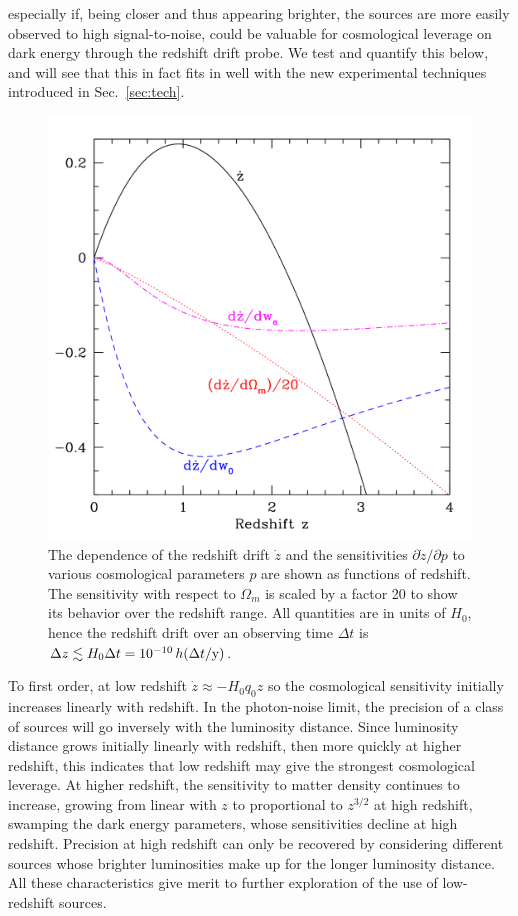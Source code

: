 \documentclass[preprint2, 10pt]{aastex}
\begin{document}
{especially if, being closer and thus appearing brighter, the sources are more
easily observed to high signal-to-noise,
could be valuable for cosmological leverage on dark energy 
through the redshift drift probe. We test and quantify this below, and will see that this in fact fits in 
well with the new experimental techniques introduced in Sec.~\ref{sec:tech}. 


\begin{figure}[tbp] 
   \centering
   \includegraphics[width=\columnwidth]{zdriftd.pdf}
\caption{The dependence of the redshift drift $\dot z$ and the sensitivities 
$\partial\dot z/\partial p$ to various cosmological parameters $p$ are shown 
as functions of redshift. The sensitivity with respect to $\Omega_m$ is 
scaled by a factor 20 to show its behavior over the redshift range. All quantities are in units of $H_0$, hence 
the redshift drift over an observing time $\Delta t$ is 
$\Delta z\lesssim H_0\Delta t=10^{-10}\,h(\Delta t/{\rm y})$. 
}
\label{fig:sens} 
\end{figure}

To first order, at
low redshift $\dot z\approx -H_0q_0z$ so the cosmological sensitivity 
initially increases linearly with redshift. 
In the photon-noise limit, the precision of a class of sources will go inversely with the luminosity distance. 
Since luminosity distance grows initially linearly with redshift, then 
more quickly at higher redshift, this indicates that low redshift may give 
the strongest cosmological leverage. 
At higher redshift, the sensitivity to matter density 
continues to increase, growing from linear with $z$ to 
proportional to $z^{3/2}$ at high redshift, swamping the dark energy 
parameters, whose sensitivities decline at high redshift. 
Precision at high redshift can only be recovered by considering different sources whose
brighter luminosities make up for the longer luminosity distance. 
All these 
characteristics give merit to further exploration of the use of 
low-redshift sources. 

}
\end{document}
